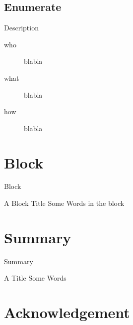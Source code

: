 \subsection{Enumerate}

\begin{frame}{Description}
  \begin{description}
  \item[who] blabla
  \item[what] blabla
  \item[how] blabla
  \end{description}
\end{frame}


\section{Block}

\begin{frame}{Block}
  \begin{block}{A Block Title}
    Some Words in the block
  \end{block}
\end{frame}

\section{Summary}

\begin{frame}{Summary}
  \begin{block}{A Title}
    Some Words
  \end{block}
\end{frame}


\section*{Acknowledgement}

 
